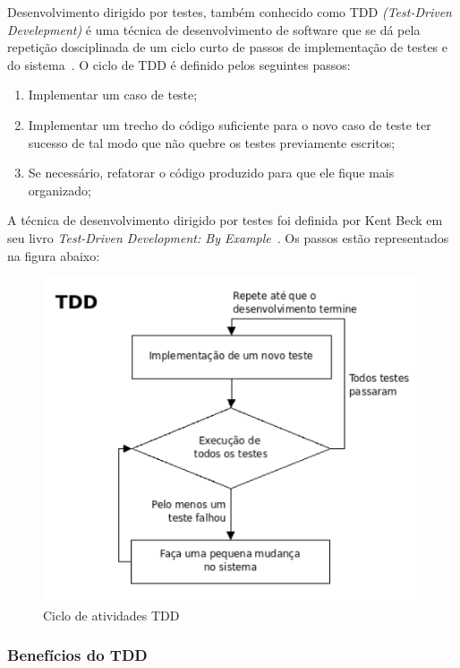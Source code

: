 Desenvolvimento dirigido por testes, também conhecido como TDD \textit{(Test-Driven Develepment)} é uma técnica de desenvolvimento de software que se dá pela repetição dosciplinada de um ciclo curto de passos de implementação de testes e do sistema~\cite{koskela2007}.
%
O ciclo de TDD é definido pelos seguintes passos:
%
\begin{enumerate}
\item Implementar um caso de teste;
\item Implementar um trecho do código suficiente para o novo caso de teste ter sucesso de tal modo que não quebre os testes previamente escritos;
\item Se necessário, refatorar o código produzido para que ele fique mais organizado;
\end{enumerate}
%
A técnica de desenvolvimento dirigido por testes foi definida por Kent Beck em seu livro \textit{Test-Driven Development: By Example}~\cite{beck2002}. Os passos estão representados na figura abaixo:
%
\begin{figure}[h]
    \centering
    \includegraphics[keepaspectratio=true,scale=0.25]
      {figuras/tdd_ciclo.png}
    \caption{Ciclo de atividades TDD~\cite{beck2002}}
    \label{tdd_ciclo}
\end{figure}
%

\subsubsection {Benefícios do TDD}

